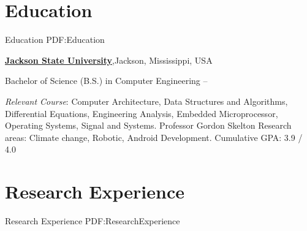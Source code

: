 \documentclass[letterpaper,10pt,oneside]{article}
\begin{document}
\begin{body}


\section
{Education}
{Education}
{PDF:Education}

\href{http://www.jsums.edu}
{\textbf{Jackson State University}},Jackson, Mississippi, USA

\GapNoBreak
\BulletItem
Bachelor of Science (B.S.) in
{Computer Engineering}
\hfill
{} --
\begin{detail}
\SubBulletItem
{\textit{Relevant Course}}: Computer Architecture, Data Structures and Algorithms, Differential Equations,  Engineering Analysis, Embedded Microprocessor, Operating Systems, Signal and Systems. 
\SubBulletItem
Professor Gordon Skelton
Research areas:
Climate change, Robotic, Android Development.
\SubBulletItem
Cumulative GPA: 3.9 / 4.0
\end{detail}






\section
{Research Experience}
{Research Experience}
{PDF:ResearchExperience}


\end{body}
\end{document}
